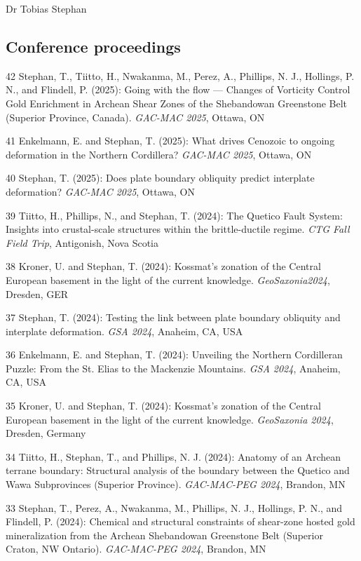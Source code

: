 \documentclass[10pt, paper=letter]{scrartcl} %
\begin{document}
\begin{cv}{\textsf{Dr Tobias Stephan}}
    \subsection{Conference proceedings}
    \begin{cvlist}{} %
         \item[42] Stephan, T., Tiitto, H., Nwakanma, M., Perez, A., Phillips, N. J., Hollings, P. N., and Flindell, P. (2025): Going with the flow --- Changes of Vorticity Control Gold Enrichment in Archean Shear Zones of the Shebandowan Greenstone Belt (Superior Province, Canada).  \textit{GAC-MAC 2025},  Ottawa, ON
         \item[41] Enkelmann, E. and Stephan, T. (2025): What drives Cenozoic to ongoing deformation in the Northern Cordillera? \textit{GAC-MAC 2025},  Ottawa, ON
        \item[40] Stephan, T. (2025): Does plate boundary obliquity predict interplate deformation? \textit{GAC-MAC 2025},  Ottawa, ON
        \item[39] Tiitto, H., Phillips, N., and Stephan, T. (2024): The Quetico Fault System: Insights into crustal-scale structures within the brittle-ductile regime. \textit{CTG Fall Field Trip},  Antigonish, Nova Scotia
        \item[38] Kroner, U. and Stephan, T. (2024): Kossmat’s zonation of the Central European basement in the light of the current knowledge. \textit{GeoSaxonia2024}, Dresden, GER
        \item[37] Stephan, T. (2024): Testing the link between plate boundary obliquity and interplate deformation. \textit{GSA 2024}, Anaheim, CA, USA
        \item[36] Enkelmann, E. and Stephan, T. (2024): Unveiling the Northern Cordilleran Puzzle: From the St. Elias to the Mackenzie Mountains. \textit{GSA 2024}, Anaheim, CA, USA
        \item[35] Kroner, U. and Stephan, T. (2024): Kossmat’s zonation of the Central European basement in the light of the current knowledge. \textit{GeoSaxonia 2024}, Dresden, Germany
        \item[34] Tiitto, H., Stephan, T., and Phillips, N. J. (2024): Anatomy of an Archean terrane boundary: Structural analysis of the boundary between the Quetico and Wawa Subprovinces (Superior Province). \textit{GAC-MAC-PEG 2024}, Brandon, MN
        \item[33] Stephan, T., Perez, A., Nwakanma, M., Phillips, N. J., Hollings, P. N., and Flindell, P. (2024): Chemical and structural constraints of shear-zone hosted gold mineralization from the Archean Shebandowan Greenstone Belt (Superior Craton, NW Ontario). \textit{GAC-MAC-PEG 2024}, Brandon, MN

\end{cvlist}
\end{cv}
\end{document}
